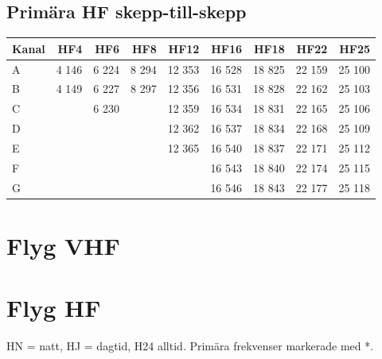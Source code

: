 {\subsection{Primära HF skepp-till-skepp}

\begin{longtable}{lrrrrrrrr}
\textbf{Kanal} & \textbf{HF4} & \textbf{HF6} & \textbf{HF8} &
               \textbf{HF12} & \textbf{HF16} & \textbf{HF18} &
               \textbf{HF22} & \textbf{HF25} \\
\hline
\endhead

A & 4 146 & 6 224 & 8 294 & 12 353 & 16 528 & 18 825 & 22 159 & 25 100 \\
B & 4 149 & 6 227 & 8 297 & 12 356 & 16 531 & 18 828 & 22 162 & 25 103 \\
C &       & 6 230 &       & 12 359 & 16 534 & 18 831 & 22 165 & 25 106 \\
D &       &       &       & 12 362 & 16 537 & 18 834 & 22 168 & 25 109 \\
E &       &       &       & 12 365 & 16 540 & 18 837 & 22 171 & 25 112 \\
F &       &       &       &        & 16 543 & 18 840 & 22 174 & 25 115 \\
G &       &       &       &        & 16 546 & 18 843 & 22 177 & 25 118 \\
\end{longtable}



\newpage

\section{Flyg VHF}

\section{Flyg HF}
HN = natt, HJ = dagtid, H24 alltid. Primära frekvenser markerade med *.

}
